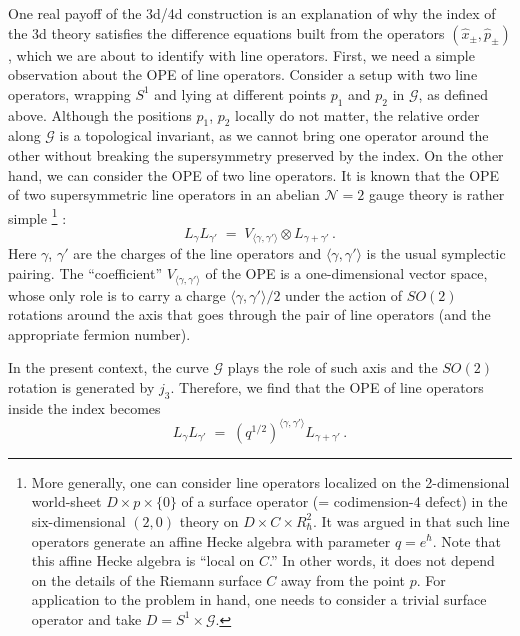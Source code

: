 \documentclass[11pt,letterpaper]{article}
\numberwithin{equation}{section}
\newcommand{\CG}{\mathcal{G}}
\newcommand{\CN}{\mathcal{N}}
\begin{document}
One real payoff of the 3d/4d construction is an explanation of why the index of the 3d theory satisfies the difference equations
built from the operators $(\hat{x}_{\pm}, \hat{p}_{\pm})$, which we are about to identify with line operators.
First, we need a simple observation about the OPE of line operators.
Consider a setup with two line operators, wrapping $S^1$ and lying at different points $p_1$ and $p_2$ in $\CG$, as defined above. Although the positions $p_1$, $p_2$ locally do not matter,
the relative order along $\CG$ is a topological invariant, as we cannot bring one operator around the other without
breaking the supersymmetry preserved by the index. On the other hand, we can consider the OPE of two line operators.
It is known that the OPE of two supersymmetric  line operators in an abelian $\CN=2$ gauge theory
is rather simple \cite{GMNIII}%
%
\footnote{More generally, one can consider line operators localized on the 2-dimensional world-sheet $D \times p \times \{ 0 \}$
of a surface operator (= codimension-4 defect) in the six-dimensional $(2,0)$ theory on $D \times C \times R^2_{\hbar}$.
It was argued in \cite{Ramified} that such line operators generate an affine Hecke algebra with parameter $q = e^{\hbar}$.
Note that this affine Hecke algebra is ``local on $C$.''
In other words, it does not depend on the details of the Riemann surface $C$ away from the point $p$.
For application to the problem in hand, one needs to consider a trivial surface operator and take $D = S^1 \times \CG$.}%
%
:
\begin{equation}
L_\gamma L_{\gamma'} \; = \; V_{\langle \gamma, \gamma' \rangle} \otimes L_{\gamma + \gamma'} \,.
\end{equation}
Here $\gamma$, $\gamma'$ are the charges of the line operators and $\langle \gamma, \gamma' \rangle$
is the usual symplectic pairing. The ``coefficient'' $V_{\langle \gamma, \gamma' \rangle}$ of the OPE
is a one-dimensional vector space, whose only role is to carry a charge $\langle \gamma, \gamma' \rangle/2$ under the action of $SO(2)$ rotations
around the axis that goes through the pair of line operators (and the appropriate fermion number).

In the present context, the curve $\CG$ plays the role of such axis and the $SO(2)$ rotation is generated by $j_3$.
Therefore, we find that the OPE of line operators inside the index becomes
\begin{equation}
L_\gamma L_{\gamma'} \; = \; (q^{1/2})^{\langle \gamma, \gamma' \rangle} L_{\gamma + \gamma'} \,.
\label{qLLOPE}
\end{equation}
\end{document}
